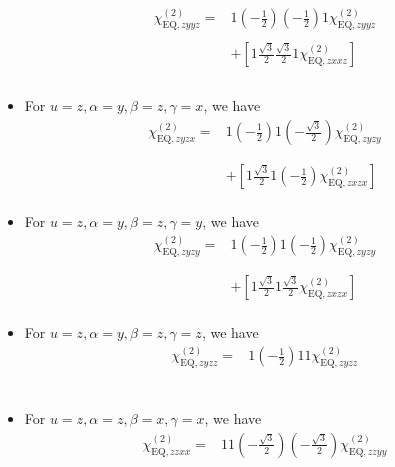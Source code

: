 \documentclass[UTF8,10pt,a4paper]{article}
\begin{document}
\begin{itemize}
\begin{align}
\nonumber\chi_{\text{EQ},zyyz}^{(2)}=&1\left(-\frac{1}{2}\right)\left(-\frac{1}{2}\right)1\chi_{\text{EQ},zyyz}^{(2)}\\
\nonumber&\\
\nonumber&+\left[1\frac{\sqrt{3}}{2}\frac{\sqrt{3}}{2}1\chi_{\text{EQ},zxxz}^{(2)}\right]\\
\nonumber&\\
&
\end{align}\normalsize
\item For $u=z,\alpha=y,\beta=z,\gamma=x$, we have
\footnotesize\begin{align}
\nonumber\chi_{\text{EQ},zyzx}^{(2)}=&1\left(-\frac{1}{2}\right)1\left(-\frac{\sqrt{3}}{2}\right)\chi_{\text{EQ},zyzy}^{(2)}\\
\nonumber&\\
\nonumber&\\
\nonumber&+\left[1\frac{\sqrt{3}}{2}1\left(-\frac{1}{2}\right)\chi_{\text{EQ},zxzx}^{(2)}\right]\\
&
\end{align}\normalsize
\item For $u=z,\alpha=y,\beta=z,\gamma=y$, we have
\footnotesize\begin{align}
\nonumber\chi_{\text{EQ},zyzy}^{(2)}=&1\left(-\frac{1}{2}\right)1\left(-\frac{1}{2}\right)\chi_{\text{EQ},zyzy}^{(2)}\\
\nonumber&\\
\nonumber&\\
\nonumber&+\left[1\frac{\sqrt{3}}{2}1\frac{\sqrt{3}}{2}\chi_{\text{EQ},zxzx}^{(2)}\right]\\
&
\end{align}\normalsize
\item For $u=z,\alpha=y,\beta=z,\gamma=z$, we have
\footnotesize\begin{align}
\nonumber\chi_{\text{EQ},zyzz}^{(2)}=&1\left(-\frac{1}{2}\right)11\chi_{\text{EQ},zyzz}^{(2)}\\
\nonumber&\\
\nonumber&\\
\nonumber&\\
&
\end{align}\normalsize
\item For $u=z,\alpha=z,\beta=x,\gamma=x$, we have
\footnotesize\begin{align}
\nonumber\chi_{\text{EQ},zzxx}^{(2)}=&11\left(-\frac{\sqrt{3}}{2}\right)\left(-\frac{\sqrt{3}}{2}\right)\chi_{\text{EQ},zzyy}^{(2)}\\
\nonumber&\\

\end{align}
\end{itemize}
\end{document}
